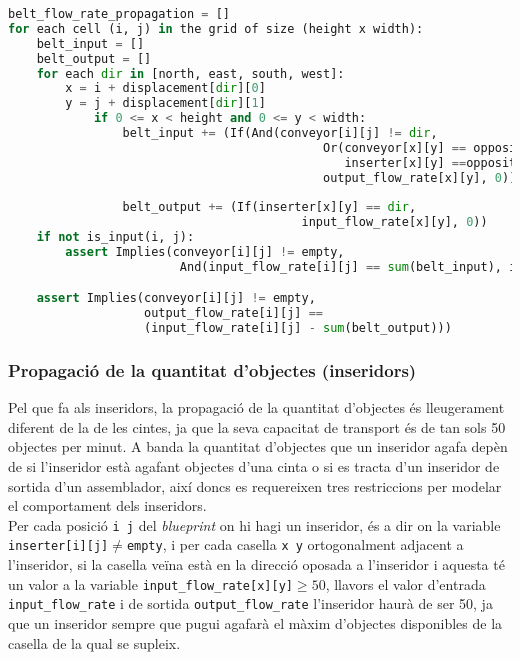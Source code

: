 \begin{lstlisting}[language=Python, caption=Belt Item Flow Propagation]
belt_flow_rate_propagation = []
for each cell (i, j) in the grid of size (height x width):
    belt_input = []
    belt_output = []
    for each dir in [north, east, south, west]:
        x = i + displacement[dir][0]
        y = j + displacement[dir][1]
            if 0 <= x < height and 0 <= y < width:
                belt_input += (If(And(conveyor[i][j] != dir,
                                            Or(conveyor[x][y] == opposite(dir),
                                               inserter[x][y] ==opposite(dir)),
                                            output_flow_rate[x][y], 0))
                                            
                belt_output += (If(inserter[x][y] == dir,
                                         input_flow_rate[x][y], 0))
    if not is_input(i, j):
        assert Implies(conveyor[i][j] != empty,
                        And(input_flow_rate[i][j] == sum(belt_input), input_flow_rate[i][j] <= 450))

    assert Implies(conveyor[i][j] != empty,
                   output_flow_rate[i][j] == 
                   (input_flow_rate[i][j] - sum(belt_output)))
\end{lstlisting}

\subsubsection{Propagació de la quantitat d'objectes (inseridors)}
Pel que fa als inseridors, la propagació de la quantitat d'objectes és lleugerament diferent de la de les cintes, ja que la seva capacitat de transport és de tan sols 50 objectes per minut. A banda la quantitat d'objectes que un inseridor agafa depèn de si l'inseridor està agafant objectes d'una cinta o si es tracta d'un inseridor de sortida d'un assemblador, així doncs es requereixen tres restriccions per modelar el comportament dels inseridors.\\

Per cada posició \texttt{i j} del \textit{blueprint} on hi hagi un inseridor, és a dir on la variable \texttt{inserter[i][j]$\neq$empty}, i per cada casella \texttt{x y} ortogonalment adjacent a l'inseridor, si la casella veïna està en la direcció oposada a l'inseridor i aquesta té un valor a la variable \texttt{input\_flow\_rate[x][y]$\ge50$}, llavors el valor d'entrada \texttt{input\_flow\_rate} i de sortida \texttt{output\_flow\_rate} l'inseridor haurà de ser 50, ja que un inseridor sempre que pugui agafarà el màxim d'objectes disponibles de la casella de la qual se supleix.\\

